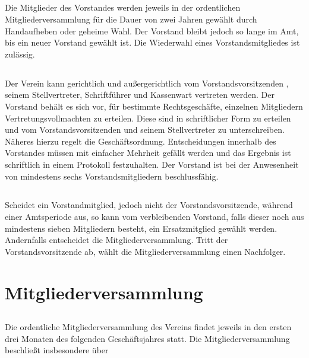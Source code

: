 	\subsection {}  Die Mitglieder des Vorstandes werden jeweils in der ordentlichen Mitgliederversammlung für die Dauer von zwei Jahren gewählt durch Handaufheben oder geheime Wahl. Der Vorstand bleibt jedoch so lange im Amt, bis ein neuer Vorstand gewählt ist. Die Wiederwahl eines Vorstandsmitgliedes ist zulässig. 
	
	\subsection {} Der Verein kann gerichtlich und außergerichtlich vom Vorstandsvorsitzenden , seinem Stellvertreter, Schriftführer und Kassenwart vertreten werden. Der Vorstand behält es sich vor, für bestimmte Rechtsgeschäfte, einzelnen Mitgliedern Vertretungsvollmachten zu erteilen. Diese sind in schriftlicher Form zu erteilen und vom Vorstandsvorsitzenden und seinem Stellvertreter zu unterschreiben. Näheres hierzu regelt die Geschäftsordnung. 
	Entscheidungen innerhalb des Vorstandes müssen mit einfacher Mehrheit gefällt werden und das Ergebnis ist schriftlich in einem Protokoll festzuhalten. Der Vorstand ist bei der Anwesenheit von mindestens sechs Vorstandsmitgliedern beschlussfähig. 
	
	\subsection {} Scheidet ein Vorstandmitglied, jedoch nicht der Vorstandsvorsitzende, während einer Amtsperiode aus, so kann vom verbleibenden Vorstand, falls dieser noch aus mindestens sieben Mitgliedern besteht, ein Ersatzmitglied gewählt werden. Andernfalls entscheidet die Mitgliederversammlung. Tritt der Vorstandsvorsitzende ab, wählt die Mitgliederversammlung einen Nachfolger. 

\section{Mitgliederversammlung}
	\subsection{} Die ordentliche Mitgliederversammlung des Vereins findet jeweils in den ersten drei Monaten des folgenden Geschäftsjahres statt. Die Mitgliederversammlung beschließt insbesondere über
	
